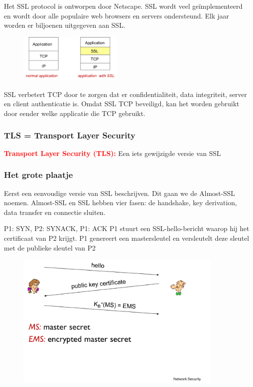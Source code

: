 \noindent Het SSL protocol is ontworpen door Netscape. SSL wordt veel geïmplementeerd en wordt door alle populaire web browsers en servers ondersteund. Elk jaar worden er biljoenen uitgegeven aan SSL.

\begin{figure}[h]
    \centering
    \includegraphics[width=2in]{./img/imghfdst8/hfdst8puntje27.png}
    \caption{ }      
    \label{fig: }
\end{figure}

\noindent SSL verbetert TCP door te zorgen dat er confidentialiteit, data integriteit, server en client authenticatie is. Omdat SSL TCP beveiligd, kan het worden gebruikt door eender welke applicatie die TCP gebruikt.

\subsubsection{TLS = Transport Layer Security}

\textcolor{red}{\textbf{Transport Layer Security (TLS):}} Een iets gewijzigde versie van SSL

\clearpage

\subsubsection{Het grote plaatje}

\noindent Eerst een eenvoudige versie van SSL beschrijven. Dit gaan we de Almost-SSL noemen. Almost-SSL en SSL hebben vier fasen: de handshake, key derivation, data transfer en connectie sluiten.


\be
\itf P1: SYN, P2: SYNACK, P1: ACK
\itf P1 stuurt een SSL-hello-bericht waarop hij het certificaat van P2 krijgt.
\itf P1 genereert een mastersleutel en versleutelt deze sleutel met de publieke sleutel van P2
\ee

\begin{figure}[h]
    \centering
    \includegraphics[width=4in]{./img/imghfdst8/hfdst8puntje28.png}
    \caption{ }      
    \label{fig: }
\end{figure}

